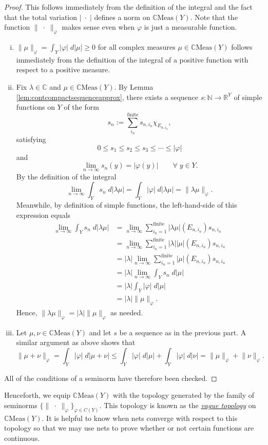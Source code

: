 \documentclass[12pt]{article}
\theoremstyle{theorem}
\theoremstyle{definition}
\numberwithin{equation}{section}
\let\l=\lambda \let\r=\rho
\let\C=\Chi \let\W=\Omega
\def\vf{\varphi}
\newcommand{\be}{\begin{equation}}
\newcommand{\ee}{\end{equation}}
\newcommand{\bprf}{\begin{proof}}
\newcommand{\eprf}{\end{proof}}
\newcommand{\<}{\langle}
\renewcommand{\>}{\rangle}
\def\R{{{\mathbb R}}}
\def\C{{{\mathbb C}}}
\def\N{{{\mathbb N}}}
\begin{document}
\bprf
This follows immediately from the definition of the integral and the fact that
the total variation $|\;\cdot\;|$ defines a norm on $\C\mathrm{Meas}(Y).$
Note that the function $\lVert\;\cdot\;\rVert_{\vf}$ makes sense even when 
$\vf$ is just a measurable function. 
\begin{enumerate}[i.]
\item
$\lVert\mu\rVert_{\vf}=\int_{Y}|\vf|\;d|\mu|\ge0$ 
for all complex measures $\mu\in\C\mathrm{Meas}(Y)$ 
follows immediately from 
the definition of the integral of a positive function with 
respect to a positive measure. 
\item
Fix $\l\in\C$ and $\mu\in\C\mathrm{Meas}(Y).$ 
By Lemma \ref{lem:contcompactsequenceapprox}, there exists a sequence
$s:\N\to\R^{Y}$ of simple functions on $Y$ of the form 
\be
s_{n}:=\sum_{i_{n}}^{\text{finite}}s_{n,i_{n}}\chi_{E_{n,i_n}},
\ee
satisfying 
\be
0\le s_{1}\le s_{2}\le s_{3}\le \cdots\le|\vf|
\ee
and 
\be
\lim_{n\to\infty} s_{n}(y)=|\vf(y)|\qquad\forall\;y\in Y.
\ee
By the definition of the integral 
\be
\lim_{n\to\infty}\int_{Y}s_{n}\;d|\l\mu|=\int_{Y}|\vf|\;d|\l\mu|
=\lVert\l\mu\rVert_{\vf}.
\ee
Meanwhile, by definition of simple functions, 
the left-hand-side of this expression equals
\be
\begin{split}
\lim_{n\to\infty}\int_{Y}s_{n}\;d|\l\mu|
&=\lim_{n\to\infty}\sum_{i_{n}=1}^{\text{finite}}|\l\mu|(E_{n,i_{n}})s_{n,i_{n}}\\
&=\lim_{n\to\infty}\sum_{i_{n}=1}^{\text{finite}}|\l||\mu|(E_{n,i_{n}})s_{n,i_{n}}\\
&=|\l|\lim_{n\to\infty}\sum_{i_{n}=1}^{\text{finite}}|\mu|(E_{n,i_{n}})s_{n,i_{n}}\\
&=|\l|\lim_{n\to\infty}\int_{Y}s_{n}\;d|\mu|\\
&=|\l|\int_{Y}|\vf|\;d|\mu|\\
&=|\l|\lVert\mu\rVert_{\vf}.
\end{split}
\ee
Hence, $\lVert\l\mu\rVert_{\vf}=|\l|\lVert\mu\rVert_{\vf}$ as needed. 
\item
Let $\mu,\nu\in\C\mathrm{Meas}(Y)$ and let $s$ be a sequence
as in the previous part. A similar argument as above shows that
\be
\lVert\mu+\nu\rVert_{\vf}=\int_{Y}|\vf|\;d|\mu+\nu|
\le\int_{Y}|\vf|\;d|\mu|+\int_{Y}|\vf|\;d|\nu|
=\lVert\mu\rVert_{\vf}+\lVert\nu\rVert_{\vf}.
\ee
\end{enumerate}
All of the conditions of a seminorm have therefore been checked. 
\eprf

Henceforth, we equip $\C\mathrm{Meas}(Y)$ with the topology 
generated by the family of seminorms 
$\big\{\lVert\;\cdot\;\rVert_{\vf}\big\}_{\vf\in C(Y)}.$
This topology is known as the \emph{\uline{vague topology}} on 
$\C\mathrm{Meas}(Y).$ It is helpful to know when nets converge
with respect to this topology so that we may use nets to prove
whether or not certain functions are continuous. 
\end{document}
